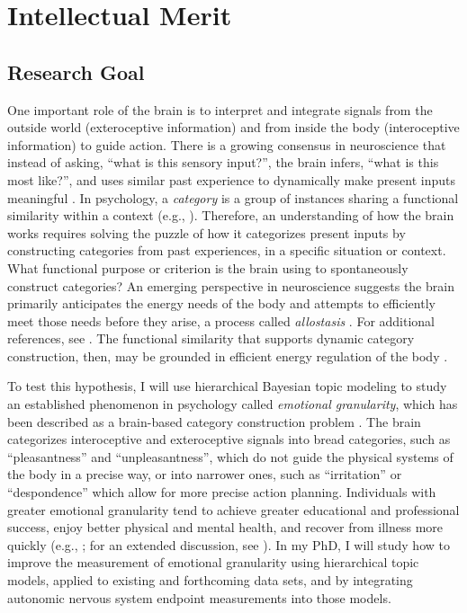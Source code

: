 \section*{Intellectual Merit}

\subsection*{Research Goal}
\begin{singlespace}
One important role of the brain is to interpret and integrate signals from the outside world (exteroceptive
information) and from inside the body (interoceptive information) to guide action.  There is
a growing consensus in neuroscience that instead of asking, ``what is this sensory input?'',
the brain infers, ``what is this most like?'', and uses similar past experience to dynamically make
present inputs meaningful \cite{Bar2009,Friston2010,BarrettTheoryOfConstructed2017}.
In psychology, a \emph{category} is a group of instances sharing a functional similarity
within a context (e.g., \cite{Grill-Spector2014,Greene2016}).
Therefore, an understanding of how the brain works requires solving the puzzle of how it categorizes
present inputs by constructing categories from past experiences, in a specific situation or context.
What functional purpose or criterion is the brain using to spontaneously construct categories?  An emerging perspective
in neuroscience suggests the brain primarily anticipates the energy needs of the body and attempts to efficiently
meet those needs before they arise, a process called \emph{allostasis} \cite{Sterling2012}.
For additional references, see \cite{sterling2015principles,Kleckner2017}.  The functional similarity that supports dynamic category construction, then, may be grounded in efficient energy regulation of the body \cite{Barrett2015,BarrettTheoryOfConstructed2017}.
\end{singlespace}

\begin{singlespace}
To test this hypothesis, I will use hierarchical Bayesian topic modeling to study an established phenomenon in psychology called \emph{emotional granularity}, which
\cite{Kashdan2015} has been described as a brain-based category construction problem \cite{BarrettTheoryOfConstructed2017}.  The brain categorizes interoceptive and exteroceptive
signals into bread categories, such as ``pleasantness'' and ``unpleasantness'', which do not
guide the physical systems of the body in a precise way, or into narrower ones, such as
``irritation'' or ``despondence'' which allow for more precise action planning.  Individuals
with greater emotional granularity tend to achieve greater educational and professional
success, enjoy better physical and mental health, and recover from illness more quickly (e.g., \cite{hoyt2013cancer,Kashdan2015}; for an extended discussion,
see \cite{barrett2017emotions}).  In my PhD, I will study how to improve the measurement
of emotional granularity using hierarchical topic models, applied to existing and forthcoming data sets,
and by integrating autonomic nervous system endpoint measurements into those models.
\end{singlespace}
